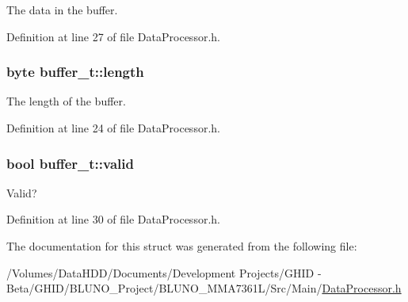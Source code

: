 \-The data in the buffer. 



\-Definition at line 27 of file \-Data\-Processor.\-h.

\hypertarget{structbuffer__t_a5f6ea3ee1957ac885233051495e45596}{
\subsubsection[{length}]{\setlength{\rightskip}{0pt plus 5cm}byte {\bf buffer\-\_\-t\-::length}}}\label{structbuffer__t_a5f6ea3ee1957ac885233051495e45596}


\-The length of the buffer. 



\-Definition at line 24 of file \-Data\-Processor.\-h.

\hypertarget{structbuffer__t_ab8c6d50976afb6e0717a0dc6e6bde41c}{
\subsubsection[{valid}]{\setlength{\rightskip}{0pt plus 5cm}bool {\bf buffer\-\_\-t\-::valid}}}\label{structbuffer__t_ab8c6d50976afb6e0717a0dc6e6bde41c}


\-Valid? 



\-Definition at line 30 of file \-Data\-Processor.\-h.



\-The documentation for this struct was generated from the following file\-:\begin{DoxyCompactItemize}
\item 
/\-Volumes/\-Data\-H\-D\-D/\-Documents/\-Development Projects/\-G\-H\-I\-D -\/ Beta/\-G\-H\-I\-D/\-B\-L\-U\-N\-O\-\_\-\-Project/\-B\-L\-U\-N\-O\-\_\-\-M\-M\-A7361\-L/\-Src/\-Main/\hyperlink{_data_processor_8h}{\-Data\-Processor.\-h}\end{DoxyCompactItemize}
